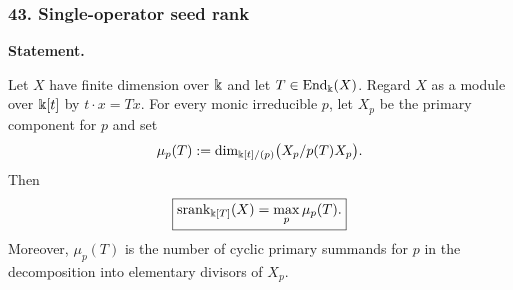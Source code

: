 \subsubsection*{43. Single-operator seed rank}
\label{rec:PSC-I-T-SINGLE-OPERATOR}
\textbf{Statement.}\par
Let $X$ have finite dimension over $\Bbbk$ and let $T\in\operatorname{End}_{\Bbbk}(X)$.  Regard $X$ as a module over $\Bbbk[t]$ by $t\cdot x=Tx$.  For every monic irreducible $p$, let $X_p$ be the primary component for $p$ and set
\[
\mu_p(T):=
\dim_{\Bbbk[t]/(p)}\bigl(X_p/p(T)X_p\bigr).
\]
Then
\[
\boxed{
\operatorname{srank}_{\Bbbk[T]}(X)=\max_p\mu_p(T).
}
\]
Moreover, $\mu_p(T)$ is the number of cyclic primary summands for $p$ in the decomposition into elementary divisors of $X_p$.

